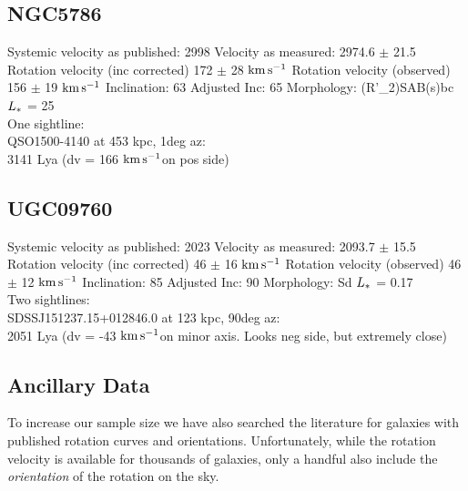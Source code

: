 \documentclass[iop]{emulateapj-rtx4}
\newcommand{\kms}{$\rm km\, s^{-1}$}
\begin{document}

%


\subsection{NGC5786}
Systemic velocity as published: 2998
Velocity as measured: 2974.6 $\pm$ 21.5
Rotation velocity (inc corrected) 172 $\pm$ 28 \kms
Rotation velocity (observed) 156 $\pm$ 19 \kms
Inclination: 63
Adjusted Inc: 65
Morphology: (R'\_2)SAB(s)bc
$L_{\**}$ = 25 \\

One sightline: \\
QSO1500-4140 at 453 kpc, 1deg az: \\
3141 Lya (dv = 166 \kms on pos side)


\subsection{UGC09760}
Systemic velocity as published: 2023
Velocity as measured: 2093.7 $\pm$ 15.5
Rotation velocity (inc corrected) 46 $\pm$ 16 \kms
Rotation velocity (observed) 46 $\pm$ 12 \kms
Inclination: 85
Adjusted Inc: 90
Morphology: Sd
$L_{\**}$ = 0.17 \\

Two sightlines: \\
SDSSJ151237.15+012846.0 at 123 kpc, 90deg az: \\
2051 Lya (dv = -43 \kms on minor axis. Looks neg side, but extremely close)



\subsection{Ancillary Data}
To increase our sample size we have also searched the literature for galaxies with published rotation curves and orientations. Unfortunately, while the rotation velocity is available for thousands of galaxies, only a handful also include the \emph{orientation} of the rotation on the sky. \\
\end{document}
